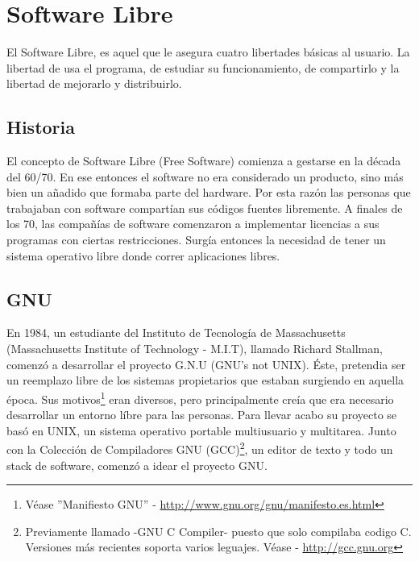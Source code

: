\section{Software Libre}\label{cap:sw_libre}

El Software Libre, es aquel que le asegura cuatro libertades b\'asicas al
usuario. La libertad de usa el programa, de estudiar su funcionamiento, de
compartirlo y la libertad de mejorarlo y distribuirlo.

\subsection{Historia}
El concepto de Software Libre (Free Software) comienza a gestarse en la 
d\'ecada del 60/70. En ese entonces el software no era considerado un
producto, sino m\'as bien un a\~nadido que formaba parte del hardware. Por esta
raz\'on las personas que trabajaban con software compart\'ian sus c\'odigos
fuentes libremente. A finales de los 70, las compa\~n\'ias de software
comenzaron a implementar licencias a sus programas con ciertas restricciones. 
Surg\'ia entonces la necesidad de tener un sistema operativo libre donde
correr aplicaciones libres.


\subsection{GNU}
En 1984, un estudiante del Instituto de Tecnolog\'ia de Massachusetts
(Massachusetts Institute of Technology - M.I.T), llamado Richard Stallman, 
comenz\'o a desarrollar el proyecto G.N.U (GNU's not UNIX).
\'Este, pretendia ser un reemplazo libre de los sistemas propietarios que 
estaban surgiendo en aquella \'epoca.
Sus motivos\footnote{V\'ease ''Manifiesto GNU'' - 
\url{http://www.gnu.org/gnu/manifesto.es.html}} eran diversos, pero
principalmente 
cre\'ia que era necesario desarrollar un entorno l\'ibre para las personas.
Para llevar acabo su proyecto se bas\'o en UNIX, un sistema operativo 
portable multiusuario y multitarea. Junto con la Colecci\'on de Compiladores
GNU (GCC)\footnote{Previamente llamado -GNU C Compiler- puesto que solo
compilaba codigo C. Versiones m\'as recientes soporta varios leguajes. V\'ease
- \url{http://gcc.gnu.org}}, un editor de texto y todo un stack de software,
comenz\'o a idear el proyecto GNU.

